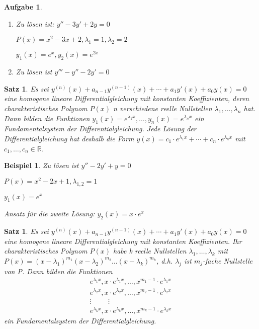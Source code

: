 \documentclass[12pt,a4paper]{scrreprt}
\newtheorem{beispiel}[defi]{Beispiel}
\newtheorem{satz}[defi]{Satz}
\newtheorem{aufg}[defi]{Aufgabe}
\begin{document}
	\begin{aufg}
		\begin{enumerate}[label=\emph{(\roman*)}]
			\item Zu lösen ist: $y''-3y'+2y=0$
			
			$P(x)=x^2-3x+2,\lambda_1=1,\lambda_2=2$

			$y_1(x)=e^x,y_2(x)=e^{2x}$

			\item Zu lösen ist $y'''-y''-2y'=0$
 		\end{enumerate}
	\end{aufg}

	\begin{satz}
		Es sei $y^{(n)}(x) + a_{n-1} y^{(n-1)}(x) + \cdots + a_1 y'(x) + a_0 y(x) = 0$ eine homogene lineare Differentialgleichung mit konstanten Koeffizienten, deren charakteristisches Polynom $P(x)$ n verschiedene reelle Nullstellen $\lambda_1,\dots,\lambda_n$ hat. Dann bilden die Funktionen $y_1(x)=e^{\lambda_1 x},\dots,y_n(x)=e^{\lambda_n x}$ ein Fundamentalsystem der Differentialgleichung. Jede Lösung der Differentialgleichung hat deshalb die Form $y(x)=c_1 \cdot e^{\lambda_1 x} + \cdots + c_n \cdot e^{\lambda_n x}$ mit $c_1,\dots,c_n \in \mathbb{R}$.
	\end{satz}

	\begin{beispiel}
		Zu lösen ist $y''-2y'+y=0$

		$P(x)=x^2-2x+1,\lambda_{1,2}=1$

		$y_1(x)=e^x$

		Ansatz für die zweite Lösung: $y_2(x)=x \cdot e^x$
	\end{beispiel}

	\begin{satz}
		Es sei $y^{(n)}(x) + a_{n-1} y^{(n-1)}(x) + \cdots + a_1 y'(x) + a_0 y(x) = 0$ eine homogene lineare Differentialgleichung mit konstanten Koeffizienten. Ihr charakteristisches Polynom $P(x)$ habe k reelle Nullstellen $\lambda_1,\dots,\lambda_k$ mit $P(x)={(x-\lambda_1)}^{m_1}{(x-\lambda_2)}^{m_2} \dots {(x-\lambda_k)}^{m_k}$, d.h. $\lambda_j$ ist $m_j$-fache Nullstelle von P. Dann bilden die Funktionen
		\begin{align*}
			e^{\lambda_1 x},x \cdot e^{\lambda_1 x},\dots,x^{m_1-1} \cdot e^{\lambda_1 x} \\
			e^{\lambda_2 x},x \cdot e^{\lambda_2 x},\dots,x^{m_2-1} \cdot e^{\lambda_2 x} \\
			\vdots \hspace{1cm} \vdots \hspace{1cm} \\
			e^{\lambda_k x},x \cdot e^{\lambda_k x},\dots,x^{m_k-1} \cdot e^{\lambda_k x}
		\end{align*}
		ein Fundamentalsystem der Differentialgleichung.
	\end{satz}
\end{document}
